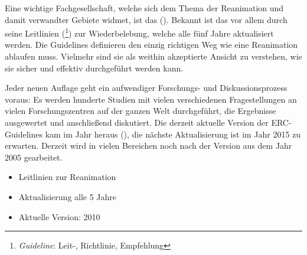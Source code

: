 {%
\label{topic:erc}
Eine wichtige Fachgesellschaft, welche sich dem Thema der
Reanimation und damit verwandter Gebiete widmet, ist das
(). Bekannt ist das
 vor allem durch seine Leitlinien
(\footnote{ \emph{Guideline}:
Leit-, Richtlinie, Empfehlung}) zur Wiederbelebung, welche
alle fünf Jahre aktualisiert werden. Die Guidelines
definieren  den einzig richtigen Weg wie eine
Reanimation ablaufen muss. Vielmehr sind sie als weithin
akzeptierte Ansicht zu
verstehen, wie sie sicher und effektiv durchgeführt werden
kann. \cite[p.1219]{Erc2010Sec1}

Jeder neuen Auflage geht ein aufwendiger Forschungs- und
Diskussionsprozess voraus: Es werden hunderte Studien mit
vielen verschiedenen Fragestellungen an vielen
Forschungszentren auf der ganzen Welt durchgeführt, die
Ergebnisse ausgewertet und anschließend diskutiert.
Die derzeit aktuelle Version
der ERC-Guidelines kam im Jahr  heraus
(), die nächste Aktualisierung ist im Jahr
2015 zu erwarten. Derzeit wird in vielen Bereichen noch nach
der Version aus dem Jahr 2005 gearbeitet.



}{%
\begin{itemize}
   \item Leitlinien zur Reanimation
   \item Aktualisierung alle 5 Jahre
   \item Aktuelle Version: 2010
\end{itemize}

}{}{}{}





